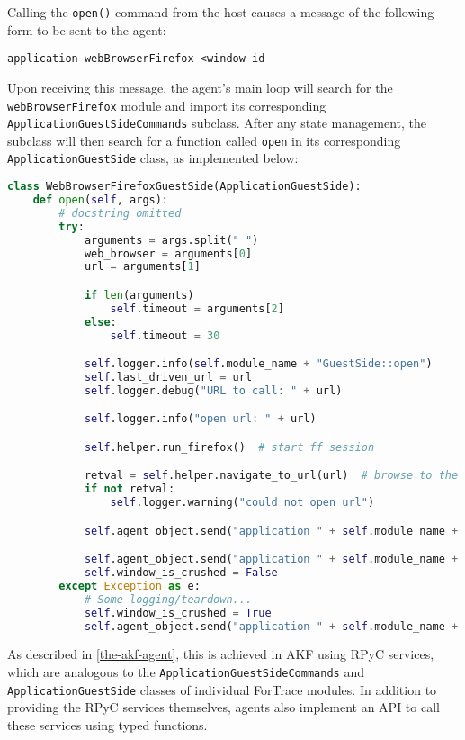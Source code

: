\documentclass[letterpaper,12pt]{report}
\newcommand{\passthrough}[1]{#1}
\begin{document}
Calling the \passthrough{\lstinline!open()!} command from the host
causes a message of the following form to be sent to the agent:

\begin{lstlisting}
application webBrowserFirefox <window id
\end{lstlisting}

Upon receiving this message, the agent's main loop will search for the
\passthrough{\lstinline!webBrowserFirefox!} module and import its
corresponding \passthrough{\lstinline!ApplicationGuestSideCommands!}
subclass. After any state management, the subclass will then search for
a function called \passthrough{\lstinline!open!} in its corresponding
\passthrough{\lstinline!ApplicationGuestSide!} class, as implemented
below:

\begin{lstlisting}[language=Python]
class WebBrowserFirefoxGuestSide(ApplicationGuestSide):
    def open(self, args):
        # docstring omitted
        try:
            arguments = args.split(" ")
            web_browser = arguments[0]
            url = arguments[1]

            if len(arguments) 
                self.timeout = arguments[2]
            else:
                self.timeout = 30

            self.logger.info(self.module_name + "GuestSide::open")
            self.last_driven_url = url
            self.logger.debug("URL to call: " + url)

            self.logger.info("open url: " + url)

            self.helper.run_firefox()  # start ff session

            retval = self.helper.navigate_to_url(url)  # browse to the specified url
            if not retval:
                self.logger.warning("could not open url")

            self.agent_object.send("application " + self.module_name + " " + str(self.window_id) + " opened")

            self.agent_object.send("application " + self.module_name + " " + str(self.window_id) + " ready")
            self.window_is_crushed = False
        except Exception as e:
            # Some logging/teardown...
            self.window_is_crushed = True
            self.agent_object.send("application " + self.module_name + " " + str(self.window_id) + " error")
\end{lstlisting}

As described in \autoref{the-akf-agent}, this is achieved in AKF using RPyC services, which are analogous
to the \passthrough{\lstinline!ApplicationGuestSideCommands!} and
\passthrough{\lstinline!ApplicationGuestSide!} classes of individual
ForTrace modules. In addition to providing the RPyC services themselves,
agents also implement an API to call these services using typed
functions.
\end{document}
